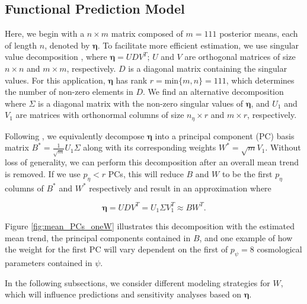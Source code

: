 \documentclass[11pt]{article}
\begin{document}
\subsection{Functional Prediction Model}
\label{subsec:pca}

Here, we begin with a $n \times m$ matrix composed of $m=111$ posterior means, 
each of length $n$, denoted by $\boldsymbol\eta$. To facilitate more efficient estimation, 
we use singular value decomposition \citep[SVD; e.g.,][]{banerjee2014linear}, 
where $\boldsymbol\eta = UDV^T$; $U$ and $V$ are orthogonal matrices of size $n \times n$ 
and $m\times m$, respectively. $D$ is a diagonal matrix containing the singular values. 
For this application, $\boldsymbol\eta$ has rank $r=\text{min}\{m,n\}=111$, which 
determines the number of non-zero elements in $D$. We find an alternative decomposition 
where $\Sigma$ is a diagonal matrix with the non-zero singular values of $\boldsymbol\eta$, 
and $U_1$ and $V_1$ are matrices with orthonormal columns of size $n_\eta \times r$ 
and $m \times r$, respectively. 

Following \cite{higdon2008computer, higdon2010estcosmo}, we equivalently decompose 
$\boldsymbol\eta$ into a principal component (PC) basis matrix 
$B^* = \frac{1}{\sqrt{m}}U_1\Sigma$ along with its corresponding weights 
$W^* = \sqrt{m}V_1$. Without loss of generality, we can perform this decomposition 
after an overall mean trend is removed. If we use $p_\eta < r$ PCs, this will reduce 
$B$ and $W$ to be the first $p_\eta$ columns of $B^*$ and $W^*$ respectively and 
result in an approximation where 

\begin{equation}
    \boldsymbol\eta= UDV^T = U_1\Sigma V_1^T \approx BW^T.
\end{equation}

Figure \ref{fig:mean_PCs_oneW} illustrates this decomposition with the estimated 
mean trend, the principal components contained in $B$, and one example of how the 
weight for the first PC will vary dependent on the first of $p_\psi=8$ cosmological 
parameters contained in $\psi$.

In the following subsections, we consider different modeling strategies for $W$, 
which will influence predictions and sensitivity analyses based on $\boldsymbol\eta$.
\end{document}
